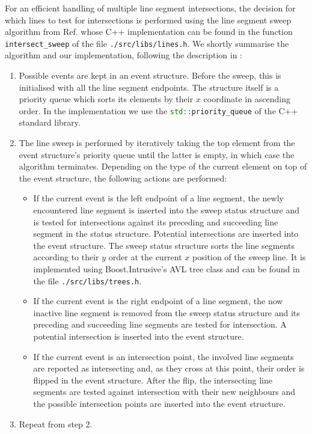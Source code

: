 For an efficient handling of multiple line segment intersections, the decision for which lines to test for intersections is
performed using the line segment sweep algorithm from Ref. \cite[pp. 69-80]{FUH_geo2020} whose C++ implementation can be
found in the function \lstinline[language=C++]|intersect_sweep| of the file \lstinline|./src/libs/lines.h|.
We shortly summarise the algorithm and our implementation, following the description in \cite[pp. 69-80]{FUH_geo2020}:
\begin{enumerate}
	\item Possible events are kept in an event structure. Before the sweep, this is initialised with all the line segment
		endpoints. The structure itself is a priority queue which sorts its elements by their $x$ coordinate in ascending order.
		In the implementation we use the \lstinline[language=C++]|std::priority_queue| of the C++ standard library.
	\item The line sweep is performed by iteratively taking the top element from the event structure's priority queue until
		the latter is empty, in which case the algorithm terminates.
		Depending on the type of the current element on top of the event structure, the following actions are performed:
		\begin{itemize}
			\item If the current event is the left endpoint of a line segment, the newly encountered line segment is
				inserted into the sweep status structure and is tested for intersections against its preceding and succeeding
				line segment in the status structure. Potential intersections are inserted into the event structure.
				The sweep status structure sorts the line segments according to their $y$ order at the current $x$ position
				of the sweep line. It is implemented using Boost.Intrusive's \cite{web_boost_intrusive}
				AVL tree class \cite{web_boost_intrusive_avltree} and can be found in the file \lstinline|./src/libs/trees.h|.
			\item If the current event is the right endpoint of a line segment, the now inactive line segment is
				removed from the sweep status structure and its preceding and succeeding line segments are tested
				for intersection. A potential intersection is inserted into the event structure.
			\item If the current event is an intersection point, the involved line segments are reported as intersecting
				and, as they cross at this point, their order is flipped in the event structure.
				After the flip, the intersecting line segments are tested against intersection with their new neighbours
				and the possible intersection points are inserted into the event structure.
		\end{itemize}
	\item Repeat from step 2.
\end{enumerate}


